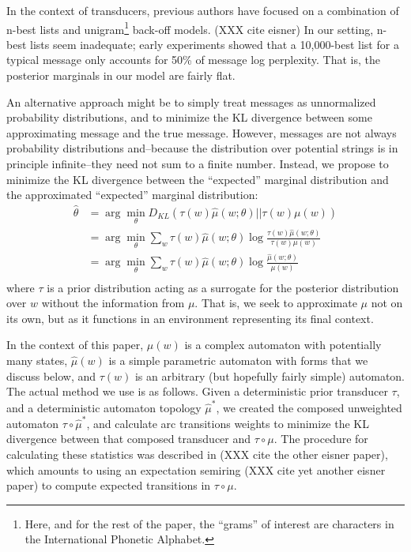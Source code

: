 \documentclass[11pt,a4paper]{article}
\begin{document}
In the context of transducers, previous authors have focused on a
combination of n-best lists and unigram\footnote{Here, and for the
rest of the paper, the ``grams'' of interest are characters in the
International Phonetic Alphabet.} back-off models. (XXX cite eisner)
In our setting, n-best lists seem inadequate; early experiments
showed that a 10,000-best list for a typical message only accounts
for 50\% of message log perplexity. That is, the posterior marginals in
our model are fairly flat.

An alternative approach might be to simply treat messages as
unnormalized probability distributions, and to minimize the KL
divergence between some approximating message and the true message.
However, messages are not always probability distributions and--because
the distribution over potential strings is in principle infinite--they
need not sum to a finite number. Instead, we propose to minimize
the KL divergence between the ``expected'' marginal distribution
and the approximated ``expected'' marginal distribution:
\begin{equation}
  \begin{split}
    \hat\theta &= \arg\!\min_{\theta} D_{KL}(\tau(w)\hat\mu(w;\theta)||\tau(w)\mu(w) ) \\
    &= \arg\!\min_{\theta} \sum_w \tau(w) \hat\mu(w;\theta) \log \frac{\tau(w)\hat\mu(w;\theta)}{\tau(w)\mu(w)} \\
    &= \arg\!\min_{\theta} \sum_w \tau(w) \hat\mu(w;\theta) \log \frac{\hat\mu(w;\theta)}{\mu(w)} \\
   \end{split}
 \end{equation}
where $\tau$ is a prior distribution acting as a surrogate for the posterior
distribution over $w$ without the information from $\mu$. That is, we 
seek to approximate $\mu$ not on its own, but as it functions in
an environment representing its final context. 

In the context of this paper, $\mu(w)$ is a complex automaton with
potentially many states, $\hat\mu(w)$ is a simple parametric automaton
with forms that we discuss below, and $\tau(w)$ is an arbitrary
(but hopefully fairly simple) automaton.  The actual method we use
is as follows. Given a deterministic prior transducer $\tau$, and
a deterministic automaton topology $\hat\mu^*$, we created the
composed unweighted automaton $\tau \circ \hat \mu^*$, and calculate
arc transitions weights to minimize the KL divergence between that
composed transducer and $\tau\circ\mu$.  The procedure for calculating
these statistics was described in (XXX cite the other eisner paper),
which amounts to using an expectation semiring (XXX cite yet another
eisner paper) to compute expected transitions in $\tau\circ\mu$.
\end{document}
